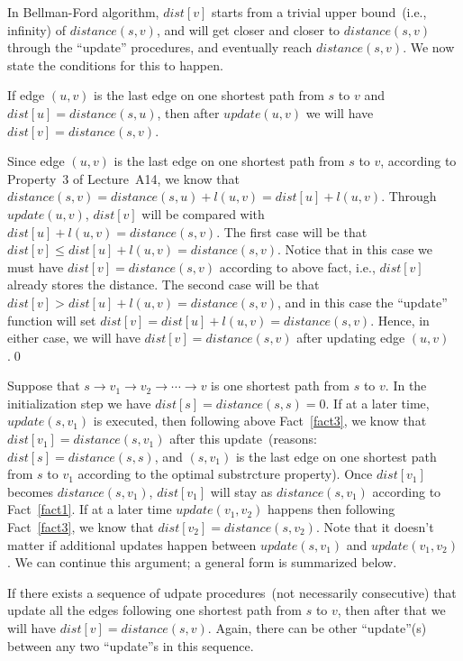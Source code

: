 In Bellman-Ford algorithm, $dist[v]$ starts from a trivial upper bound~(i.e., infinity) of $distance(s,v)$,
and will get closer and closer to $distance(s,v)$ through the ``update'' procedures,
and eventually reach $distance(s, v)$.  We now state the conditions for this to happen.

\begin{fact}
\label{fact3}
If edge $(u,v)$ is the last edge on one shortest path from $s$ to $v$ and $dist[u] = distance(s,u)$, then after $update(u,v)$ we will have $dist[v] = distance(s,v)$.
\end{fact}
Since edge $(u,v)$ is the last edge on one shortest path from $s$ to $v$, according to Property~3 of Lecture~A14, we know that
$distance(s,v) = distance(s,u) + l(u,v) = dist[u] + l(u,v)$. Through $update(u,v)$, $dist[v]$ will be compared with $dist[u] + l(u,v) = distance(s,v)$.
The first case will be that $dist[v] \le dist[u] + l(u,v) = distance(s,v)$. Notice that in this case we must have 
$dist[v] = distance(s,v)$ according to above fact, i.e., $dist[v]$ already stores the distance.
The second case will be that $dist[v] > dist[u] + l(u,v) = distance(s,v)$, and in this case the ``update'' function
will set $dist[v] = dist[u] + l(u,v) = distance(s,v)$. 
Hence, in either case, we will have $dist[v] = distance(s,v)$ after updating edge $(u,v)$.\qed


Suppose that $s \to v_1 \to v_2 \to \cdots \to v$ is one shortest path from $s$ to $v$.
In the initialization step we have $dist[s] = distance(s,s) = 0$. 
If at a later time, $update(s, v_1)$ is executed, then following above Fact~\ref{fact3}, 
we know that $dist[v_1] = distance(s, v_1)$ after this update~(reasons: $dist[s] = distance(s,s)$,
and $(s,v_1)$ is the last edge on one shortest path from $s$ to $v_1$ according to the optimal substrcture property).
Once $dist[v_1]$ becomes $distance(s,v_1)$, $dist[v_1]$ will stay as $distance(s,v_1)$ according to Fact~\ref{fact1}.
If at a later time $update(v_1, v_2)$ happens 
then following Fact~\ref{fact3}, we know that $dist[v_2] = distance(s, v_2)$.
Note that it doesn't matter if additional updates happen between $update(s, v_1)$ and $update(v_1, v_2)$.
We can continue this argument; a general form is summarized below.

\begin{fact}
\label{fact4}
If there exists a sequence of udpate procedures~(not necessarily consecutive) that update all the edges following one shortest path
from $s$ to $v$, then after that we will have $dist[v] = distance(s, v)$.
Again, there can be other ``update''(s) between any two ``update''s in this sequence.
\end{fact}



